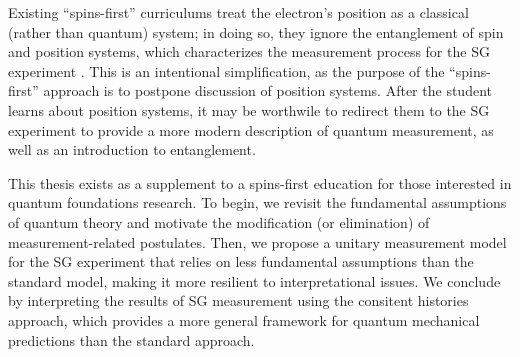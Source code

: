 Existing ``spins-first'' curriculums treat the electron's position as a classical (rather than quantum) system; in doing so, they ignore the entanglement of spin and position systems, which characterizes the measurement process for the SG experiment \cite{rodriguez}. This is an intentional simplification, as the purpose of the ``spins-first'' approach is to postpone discussion of position systems. After the student learns about position systems, it may be worthwile to redirect them to the SG experiment to provide a more modern description of quantum measurement, as well as an introduction to entanglement.

This thesis exists as a supplement to a spins-first education for those interested in quantum foundations research. To begin, we revisit the fundamental assumptions of quantum theory and motivate the modification (or elimination) of measurement-related postulates. Then, we propose a unitary measurement model for the SG experiment that relies on less fundamental assumptions than the standard model, making it more resilient to interpretational issues. We conclude by interpreting the results of SG measurement using the consitent histories approach, which provides a more general framework for quantum mechanical predictions than the standard approach.

%

